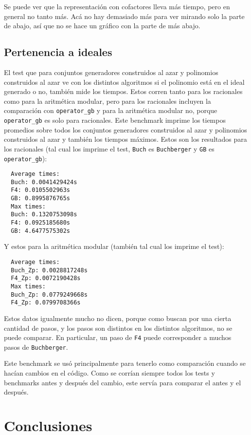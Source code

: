 \documentclass[12pt]{report}
\theoremstyle{customstyle}
\theoremstyle{factstyle}
\begin{document}
Se puede ver que la representación con cofactores lleva más tiempo, pero en general no tanto más. Acá no hay demasiado más para ver mirando solo la parte de abajo, así que no se hace un gráfico con la parte de más abajo.

\section{Pertenencia a ideales}

El test que para conjuntos generadores construidos al azar y polinomios construidos al azar ve con los distintos algoritmos si el polinomio está en el ideal generado o no, también mide los tiempos. Estos corren tanto para los racionales como para la aritmética modular, pero para los racionales incluyen la comparación con \texttt{operator\_gb} y para la aritmética modular no, porque \texttt{operator\_gb} es solo para racionales. Este benchmark imprime los tiempos promedios sobre todos los conjuntos generadores construidos al azar y polinomios construidos al azar y también los tiempos máximos. Estos son los resultados para los racionales (tal cual los imprime el test, \texttt{Buch} es \texttt{Buchberger} y \texttt{GB} es \texttt{operator\_gb}):

\begin{verbatim}
  Average times:
  Buch: 0.0041429424s
  F4: 0.0105502963s
  GB: 0.8995876765s
  Max times:
  Buch: 0.1320753098s
  F4: 0.0925185680s
  GB: 4.6477575302s
\end{verbatim}

Y estos para la aritmética modular (también tal cual los imprime el test):

\begin{verbatim}
  Average times:
  Buch_Zp: 0.0028817248s
  F4_Zp: 0.0072190428s
  Max times:
  Buch_Zp: 0.0779249668s
  F4_Zp: 0.0799708366s
\end{verbatim}

Estos datos igualmente mucho no dicen, porque como buscan por una cierta cantidad de pasos, y los pasos son distintos en los distintos algoritmos, no se puede comparar. En particular, un paso de \texttt{F4} puede corresponder a muchos pasos de \texttt{Buchberger}.

Este benchmark se usó principalmente para tenerlo como comparación cuando se hacían cambios en el código. Como se corrían siempre todos los tests y benchmarks antes y después del cambio, este servía para comparar el antes y el después.

\chapter{Conclusiones}\label{cap:Conclusiones}
\end{document}
